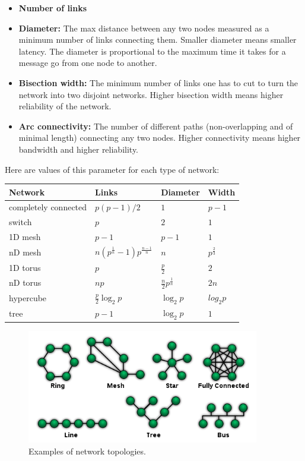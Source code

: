 \documentclass[justified,sixbynine]{tufte-book}
\theoremstyle{plain}%
\theoremstyle{definition}
\theoremstyle{remark}
\begin{document}
\begin{fullwidth}
\begin{itemize}
\item {\bf Number of links}

\item {\bf Diameter:} The max distance between any two nodes measured as a minimum number of links connecting them. Smaller diameter means smaller latency. The diameter is proportional to the maximum time it takes for a message go from one node to another.

\item {\bf Bisection width:} The minimum number of links one has to cut to turn the network into two disjoint networks. Higher bisection width means higher reliability of the network.

\item {\bf Arc connectivity:} The number of different paths (non-overlapping and of minimal length) connecting any two nodes. Higher connectivity means higher bandwidth and higher reliability.
\end{itemize}

Here are values of this parameter for each type of network:

\begin{tabular}{|l|lll|} \hline
Network              & Links & Diameter & Width \\ \hline
completely connected & $p(p-1)/2$   & $1$   & $p-1$ \\
switch               & $p$          & $2$   & $1$ \\
1D mesh              & $p-1$        & $p-1$ & $1$ \\
nD mesh              & $n(p^{\frac1n}-1)p^{\frac{n-1}n}$ & $n$ & $p^{\frac23}$ \\
1D torus             & $p$          & $\frac{p}2$ & $2$ \\
nD torus             & $np$         & $\frac{n}2 p^{\frac1n}$ & $2n$ \\
hypercube            & $\frac{p}2 \log_2 p$ & $\log_2 p$ & $log_2 p$ \\
tree                 & $p-1$        & $\log_2 p$ & $1$ \\ \hline
\end{tabular}

\begin{figure}[ht]
\centering\includegraphics[width=4in]{images/network_topologies.png}
\caption{Examples of network topologies.}
\end{figure}


\end{fullwidth}
\end{document}
